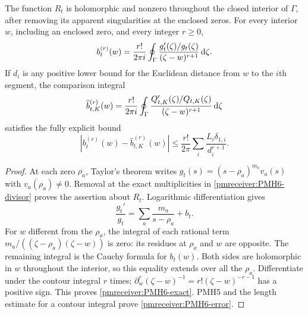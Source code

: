 \documentclass[11pt]{article}
\begin{document}
\begin{pmreceivertheorem}
\label{pmreceiver:PMH6}
The function $R_t$ is holomorphic and nonzero throughout the closed
interior of $\Gamma$, after removing its apparent singularities at
the enclosed zeros. For every interior $w$, including an enclosed
zero, and every integer $r\ge0$,
\begin{equation}\label{pmreceiver:PMH6-exact}
 b_t^{(r)}(w)=\frac{r!}{2\pi i}\oint_\Gamma
       \frac{g_t'(\zeta)/g_t(\zeta)}{(\zeta-w)^{r+1}}\,\mathrm d\zeta.
\end{equation}
If $d_i$ is any positive lower bound for the Euclidean distance
from $w$ to the $i$th segment, the comparison integral
\begin{equation}\label{pmreceiver:PMH6-approx}
 \widehat b_{t,K}^{(r)}(w)=\frac{r!}{2\pi i}\oint_\Gamma
       \frac{Q_{t,K}'(\zeta)/Q_{t,K}(\zeta)}{(\zeta-w)^{r+1}}\,\mathrm d\zeta
\end{equation}
satisfies the fully explicit bound
\begin{equation}\label{pmreceiver:PMH6-error}
 |b_t^{(r)}(w)-\widehat b_{t,K}^{(r)}(w)|
 \le\frac{r!}{2\pi}\sum_i\frac{L_i\delta_{1,i}}{d_i^{r+1}}.
\end{equation}
\end{pmreceivertheorem}
\begin{proof}
At each zero $\rho_a$, Taylor's theorem writes
$g_t(s)=(s-\rho_a)^{m_a}v_a(s)$ with $v_a(\rho_a)\ne0$.
Removal at the exact multiplicities in \eqref{pmreceiver:PMH6-divisor} proves
the assertion about $R_t$. Logarithmic differentiation gives
\[
 \frac{g_t'}{g_t}=\sum_a\frac{m_a}{s-\rho_a}+b_t.
\]
For $w$ different from the $\rho_a$, the integral of each rational
term $m_a/((\zeta-\rho_a)(\zeta-w))$ is zero: its residues at
$\rho_a$ and $w$ are opposite. The remaining integral is the
Cauchy formula for $b_t(w)$. Both sides are holomorphic in $w$
throughout the interior, so this equality extends over all the
$\rho_a$. Differentiate under the contour integral $r$ times;
$\partial_w^r(\zeta-w)^{-1}=r!(\zeta-w)^{-r-1}$ has a positive
sign. This proves \eqref{pmreceiver:PMH6-exact}. PMH5 and the length estimate
for a contour integral prove \eqref{pmreceiver:PMH6-error}.
\end{proof}
\end{document}
